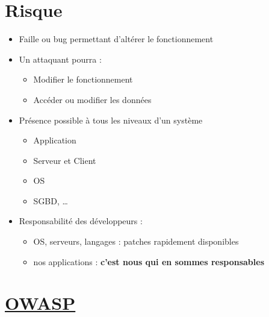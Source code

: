 \hypertarget{risque}{%
\section{Risque}\label{risque}}

\begin{itemize}
\tightlist
\item
  Faille ou bug permettant d'altérer le fonctionnement
\item
  Un attaquant pourra :

  \begin{itemize}
  \tightlist
  \item
    Modifier le fonctionnement
  \item
    Accéder ou modifier les données
  \end{itemize}
\item
  Présence possible à tous les niveaux d'un système

  \begin{itemize}
  \tightlist
  \item
    Application
  \item
    Serveur et Client
  \item
    OS
  \item
    SGBD, \ldots{}
  \end{itemize}
\item
  Responsabilité des développeurs :

  \begin{itemize}
  \tightlist
  \item
    OS, serveurs, langages : patches rapidement disponibles
  \item
    nos applications : \textbf{c'est nous qui en sommes responsables}
  \end{itemize}
\end{itemize}

\hypertarget{owasp26}{%
\section{\texorpdfstring{\href{https://owasp.org/}{OWASP}}{OWASP}}\label{owasp26}}

